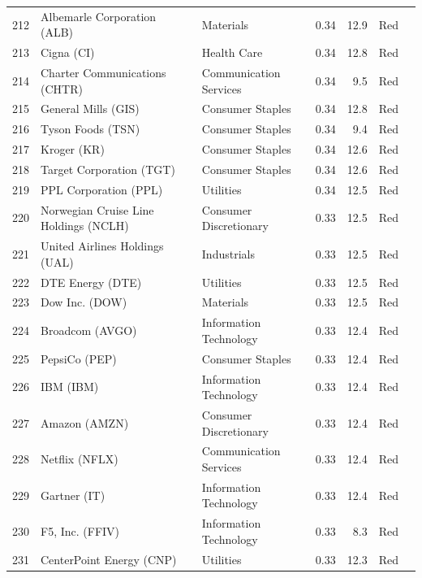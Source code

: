 \documentclass[11pt,a4paper]{article}
\begin{document}
{\begin{longtable}{r p{4.4cm} p{2.8cm} r r l l}
212 & Albemarle Corporation (ALB) & Materials & 0.34 & 12.9 & \cellcolor[HTML]{F4B6B6}Red &  \\
213 & Cigna (CI) & Health Care & 0.34 & 12.8 & \cellcolor[HTML]{F4B6B6}Red &  \\
214 & Charter Communications (CHTR) & Communication Services & 0.34 & 9.5 & \cellcolor[HTML]{F4B6B6}Red &  \\
215 & General Mills (GIS) & Consumer Staples & 0.34 & 12.8 & \cellcolor[HTML]{F4B6B6}Red &  \\
216 & Tyson Foods (TSN) & Consumer Staples & 0.34 & 9.4 & \cellcolor[HTML]{F4B6B6}Red &  \\
217 & Kroger (KR) & Consumer Staples & 0.34 & 12.6 & \cellcolor[HTML]{F4B6B6}Red &  \\
218 & Target Corporation (TGT) & Consumer Staples & 0.34 & 12.6 & \cellcolor[HTML]{F4B6B6}Red &  \\
219 & PPL Corporation (PPL) & Utilities & 0.34 & 12.5 & \cellcolor[HTML]{F4B6B6}Red &  \\
220 & Norwegian Cruise Line Holdings (NCLH) & Consumer Discretionary & 0.33 & 12.5 & \cellcolor[HTML]{F4B6B6}Red &  \\
221 & United Airlines Holdings (UAL) & Industrials & 0.33 & 12.5 & \cellcolor[HTML]{F4B6B6}Red &  \\
222 & DTE Energy (DTE) & Utilities & 0.33 & 12.5 & \cellcolor[HTML]{F4B6B6}Red &  \\
223 & Dow Inc. (DOW) & Materials & 0.33 & 12.5 & \cellcolor[HTML]{F4B6B6}Red &  \\
224 & Broadcom (AVGO) & Information Technology & 0.33 & 12.4 & \cellcolor[HTML]{F4B6B6}Red &  \\
225 & PepsiCo (PEP) & Consumer Staples & 0.33 & 12.4 & \cellcolor[HTML]{F4B6B6}Red &  \\
226 & IBM (IBM) & Information Technology & 0.33 & 12.4 & \cellcolor[HTML]{F4B6B6}Red &  \\
227 & Amazon (AMZN) & Consumer Discretionary & 0.33 & 12.4 & \cellcolor[HTML]{F4B6B6}Red &  \\
228 & Netflix (NFLX) & Communication Services & 0.33 & 12.4 & \cellcolor[HTML]{F4B6B6}Red &  \\
229 & Gartner (IT) & Information Technology & 0.33 & 12.4 & \cellcolor[HTML]{F4B6B6}Red &  \\
230 & F5, Inc. (FFIV) & Information Technology & 0.33 & 8.3 & \cellcolor[HTML]{F4B6B6}Red &  \\
231 & CenterPoint Energy (CNP) & Utilities & 0.33 & 12.3 & \cellcolor[HTML]{F4B6B6}Red &  \\

\end{longtable}}
\end{document}
